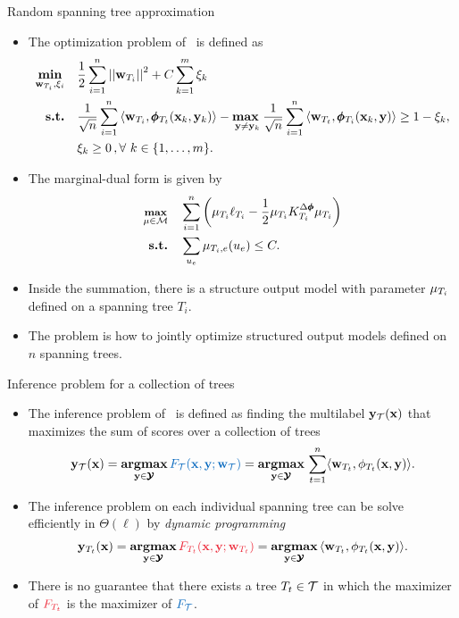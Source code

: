 \documentclass[first=dgreen,second=purple,logo=red]{aaltoslides}
\begin{document}
%
\begin{frame}{Random spanning tree approximation \rta}
	\begin{itemize}\footnotesize
		\item The optimization problem of \rta\ is defined as \cite{su14multilabelnips}
		\begin{align*}
			\underset{\mathbf {w}_{T_i},\xi_i}{\textbf{min}} & \quad \frac{1}{2}\sum_{i=1}^{n}\left|\left| \mathbf {w}_{T_i} \right|\right|^2 + C\sum_{k=1}^{m}\xi_k\\
			\textbf{s.t.} & \quad \frac{1}{\sqrt{n}}\sum_{i=1}^{n}{ \langle \mathbf {w}_{T_i}, \pmb \phi_{T_t}(\mathbf {x}_k,\mathbf {y}_k) \rangle} - \underset{\mathbf {y} \neq \mathbf {y}_k}{\textbf{max}\ } \frac{1}{\sqrt{n}}\sum_{i=1}^{n}{\langle \mathbf {w}_{T_t}, \pmb \phi_{T_i}(\mathbf {x}_k,\mathbf {y}) \rangle } \geq 1 -  \xi_k, \\
			& \quad \xi_k\ge0\, , \forall\ k \in \{ 1,\dots,m \}.
		\end{align*}
		\item The marginal-dual form is given by
		\begin{align*}\footnotesize
			\underset{\mathbf {\mu}\in\mathcal{M}}{\textbf{max}} & \quad \sum_{i=1}^{n}\left( \mathbf {\mu}_{T_i}\mathbf {\ell}_{T_i} - \frac{1}{2}\mathbf {\mu}_{T_i}K^{\Delta\pmb \phi}_{T_i}\mathbf {\mu}_{T_i}\right)\\
			\textbf{s.t.} & \quad \sum_{u_e}\mathbf {\mu}_{T_i,e}(u_e)\le C.
		\end{align*}
		\item Inside the summation, there is a structure output model with parameter $\mathbf {\mu}_{T_i}$ defined on a spanning tree $T_i$.
		\item The problem is how to jointly optimize structured output models defined on $n$ spanning trees.
	\end{itemize}
\end{frame}

%
\begin{frame}{Inference problem for a collection of trees}
	\begin{itemize}
		\item The inference problem of \rta\ is defined as finding the multilabel $\mathbf {y}_{\mathcal{T}}(\mathbf {x})$ that maximizes the sum of scores over a collection of trees
		\begin{align*}
			\vy_{\Tcal}(\vx) = \underset{\vy\in\vYcal}{\argmax}\,{\color{aaltoblue}F_{\Tcal}(\vx,\vy;\vw_{\Tcal})} = \underset{\vy\in\vYcal}{\argmax}\,\sum_{t=1}^{n}\ip{\vw_{T_t}}{\phi_{T_t}(\vx,\vy)}.
		\end{align*}
		\item The inference problem on each individual spanning tree can be solve efficiently in $\Theta(\ell)$ by \textit{dynamic programming}
		\begin{align*}
			\vy_{T_t}(\vx) = \underset{\vy\in\vYcal}{\argmax}\,{\color{aaltored}F_{T_t}(\vx,\vy;\vw_{T_t})}= \underset{\vy\in\vYcal}{\argmax}\,\ip{\vw_{T_t}}{\phi_{T_t}(\vx,\vy)}.
		\end{align*}
		\item There is no guarantee that there exists a tree $T_t\in\mathcal{T}$ in which the maximizer of ${\color{aaltored}F_{T_t}}$ is the maximizer of ${\color{aaltoblue}F_{\Tcal}}$.
	\end{itemize}
\end{frame}
\end{document}
